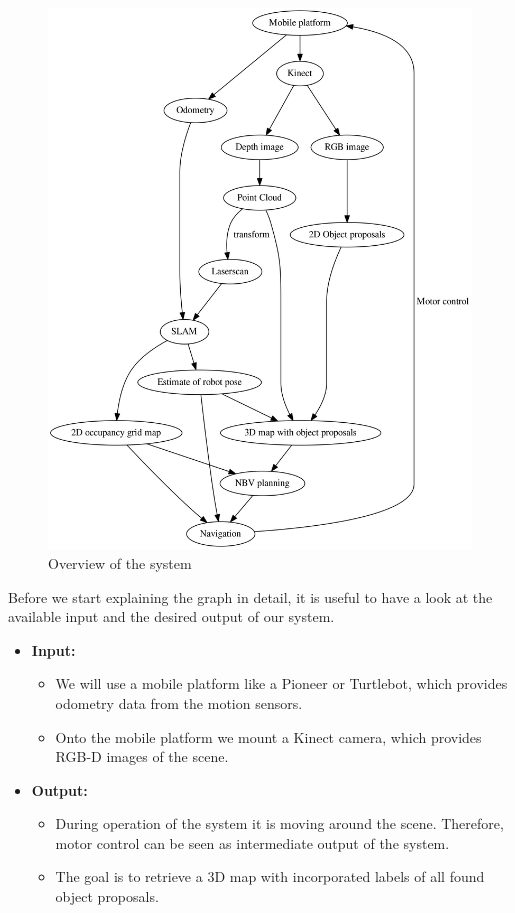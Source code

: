 \documentclass[a4paper,11pt,english]{article}
\begin{document}
\begin{figure}
	\begin{center}
		\includegraphics[width=1\linewidth]{dot/overview.png} 
		\caption{Overview of the system}
		\label{fig:overview}
	\end{center}
\end{figure}

Before we start explaining the graph in detail, it is useful to have a look at the available input and the desired output of our system.
\begin{itemize}
	\item \textbf{Input:}
	\begin{itemize}
		\item We will use a mobile platform like a Pioneer or Turtlebot, which provides odometry data from the motion sensors.
		\item Onto the mobile platform we mount a Kinect camera, which provides RGB-D images of the scene.
	\end{itemize}
	\item \textbf{Output:}
	\begin{itemize}
		\item During operation of the system it is moving around the scene. Therefore, motor control can be seen as intermediate output of the system.
		\item The goal is to retrieve a 3D map with incorporated labels of all found object proposals.
	\end{itemize}  
\end{itemize}
\end{document}
